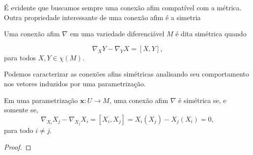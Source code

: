 É evidente que buscamos sempre uma conexão afim compatível com a métrica. Outra propriedade interessante de uma conexão afim é a simetria
\begin{definition}
	\label{def:conexao-simetrica}
	Uma conexão afim $\nabla$ em uma variedade diferenciável $M$ é dita simétrica quando

	\begin{equation*}
		\nabla_{X}Y-\nabla_{Y}X=\left[X,Y\right],
	\end{equation*}
	para todos $X, Y \in \chi(M)$.
\end{definition}
Podemos caracterizar as conexões afins simétricas analisando seu comportamento nos vetores induzidos por uma parametrização.
\begin{proposition}
	\label{prop:conexao-simetrica-equivalencia}
	Em uma parametrização $\mathbf{x}:U\to M$, uma conexão afim $\nabla$ é simétrica se, e somente se,
	\begin{equation}
		\label{eq:equivalencia-simetria}
		\nabla_{X_{i}}X_{j}-\nabla_{X_{j}}X_{i} = \left[X_{i}, X_{j}\right]=X_{i}(X_{j})-X_{j}(X_{i})=0,
	\end{equation}
	para todo $i\neq j$.
	\begin{proof}


\end{proof}
\end{proposition}
